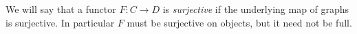 \documentclass{amsbook} %
\newcommand{\ELnn}{E\Lambda(\underline{2n})}
\numberwithin{section}{chapter}
\begin{document}
%




%



\begin{Defi}
We will say that a functor $F: C \to D$ is \emph{surjective} if the underlying map of graphs is surjective. In particular $F$ must be surjective on objects, but it need not be full.
\end{Defi}
\end{document}
